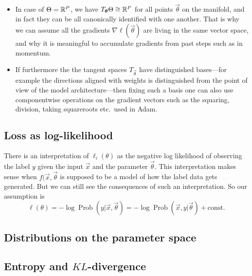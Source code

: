\documentclass[12pt]{amsart}
\DeclareMathOperator{\Prob}{Prob}
\begin{document}
\begin{itemize}
\item In case of $\Theta = \mathbb{R}^P$, we have $T_{\mathbf{\boldsymbol{\theta}}} \Theta \cong \mathbb{R}^P$ for all points $\vec{\theta}$ on the manifold, and in fact they can be all canonically identified with one another. That is why we can assume all the gradients $\nabla \ell(\vec{\theta})$ are living in the same vector space, and why it is meaningful to accumulate gradients from past steps such as in momentum.
\item If furthermore the the tangent spaces $T_{\vec{\theta}}$ have distinguished bases---for example the directions aligned with weights is distinguished from the point of view of the model architecture---then fixing such a basis one can also use componentwise operations on the gradient vectors such as the squaring, division, taking squareroots etc.\ used in Adam.
\end{itemize}

\subsection*{Loss as log-likelihood} 

There is an interpretation of $\ell_i(\theta)$ as the negative log likelihood of observing  the label $y$ given the input $\vec{x}$ and the parameter $\vec{\theta}$. This interpretation makes sense when $f(\vec{x}, \vec{\theta}$ is supposed to be a model of how the label data gets generated.  But we can still see the consequences of such an interpretation. So our assumption is 
\[
	\ell(\theta) = -\log \Prob(y | \vec{x}, \vec{\theta}) = - \log \Prob(\vec{x}, y | \vec{\theta}) + \text{const.}
\] 

\subsection*{Distributions on the parameter space} 
\subsection*{Entropy and $KL$-divergence} 
\end{document}
